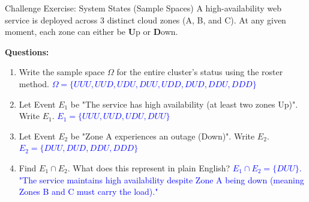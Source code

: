 \documentclass[aspectratio=169]{beamer}
\begin{document}
\begin{frame}{Challenge Exercise: System States (Sample Spaces)}
    A high-availability web service is deployed across 3 distinct cloud zones (A, B, and C). At any given moment, each zone can either be \textbf{U}p or \textbf{D}own.
    \vspace{0.2cm}

    \textbf{Questions:}
    \begin{enumerate}
        \item Write the sample space $\Omega$ for the entire cluster's status using the roster method. \pause 
        \newline \textcolor{blue}{$\Omega = \{UUU, UUD, UDU, DUU, UDD, DUD, DDU, DDD\}$} \pause
        
        \item Let Event $E_1$ be "The service has high availability (at least two zones Up)". Write $E_1$. \pause 
        \newline \textcolor{blue}{$E_1 = \{UUU, UUD, UDU, DUU\}$} \pause
        
        \item Let Event $E_2$ be "Zone A experiences an outage (Down)". Write $E_2$. \pause 
        \newline \textcolor{blue}{$E_2 = \{DUU, DUD, DDU, DDD\}$} \pause
        
        \item Find $E_1 \cap E_2$. What does this represent in plain English? \pause 
        \newline \textcolor{blue}{$E_1 \cap E_2 = \{DUU\}$. "The service maintains high availability despite Zone A being down (meaning Zones B and C must carry the load)."}
    \end{enumerate}
\end{frame}
\end{document}
